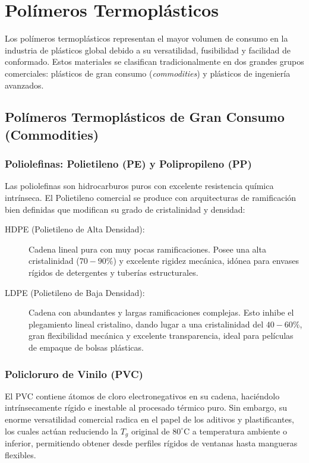 \chapter{Polímeros Termoplásticos}
\label{cap:termoplasticos}

Los polímeros termoplásticos representan el mayor volumen de consumo en la industria de plásticos global debido a su versatilidad, fusibilidad y facilidad de conformado. Estos materiales se clasifican tradicionalmente en dos grandes grupos comerciales: plásticos de gran consumo (\textit{commodities}) y plásticos de ingeniería avanzados.

\section{Polímeros Termoplásticos de Gran Consumo (Commodities)}

\subsection{Poliolefinas: Polietileno (PE) y Polipropileno (PP)}
Las poliolefinas son hidrocarburos puros con excelente resistencia química intrínseca. El Polietileno comercial se produce con arquitecturas de ramificación bien definidas que modifican su grado de cristalinidad y densidad:
\begin{description}
    \item[HDPE (Polietileno de Alta Densidad):] Cadena lineal pura con muy pocas ramificaciones. Posee una alta cristalinidad ($70 - 90\%$) y excelente rigidez mecánica, idónea para envases rígidos de detergentes y tuberías estructurales.
    \item[LDPE (Polietileno de Baja Densidad):] Cadena con abundantes y largas ramificaciones complejas. Esto inhibe el plegamiento lineal cristalino, dando lugar a una cristalinidad del $40 - 60\%$, gran flexibilidad mecánica y excelente transparencia, ideal para películas de empaque de bolsas plásticas.
\end{description}

\subsection{Policloruro de Vinilo (PVC)}
El PVC contiene átomos de cloro electronegativos en su cadena, haciéndolo intrínsecamente rígido e inestable al procesado térmico puro. Sin embargo, su enorme versatilidad comercial radica en el papel de los aditivos y plastificantes, los cuales actúan reduciendo la $T_g$ original de $80^\circ\text{C}$ a temperatura ambiente o inferior, permitiendo obtener desde perfiles rígidos de ventanas hasta mangueras flexibles.

